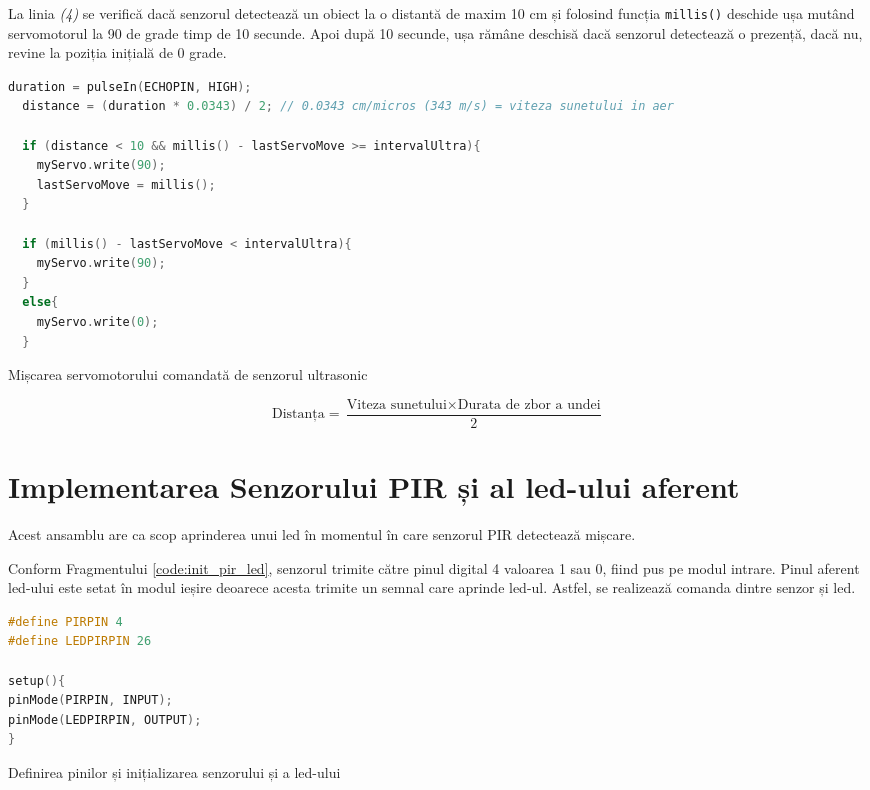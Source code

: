 La linia \textit{(4)} se verifică dacă senzorul detectează un obiect la o distantă de maxim 10 cm și folosind funcția \texttt{millis()} deschide ușa mutând servomotorul la 90 de grade timp de 10 secunde. Apoi după 10 secunde, ușa rămâne deschisă dacă senzorul detectează o prezență, dacă nu, revine la poziția inițială de 0 grade.

\begin{code}[H]
\begin{lstlisting}[language=C++]
  duration = pulseIn(ECHOPIN, HIGH);
  distance = (duration * 0.0343) / 2; // 0.0343 cm/micros (343 m/s) = viteza sunetului in aer
  
  if (distance < 10 && millis() - lastServoMove >= intervalUltra){ 
    myServo.write(90);
    lastServoMove = millis(); 
  }

  if (millis() - lastServoMove < intervalUltra){
    myServo.write(90); 
  }
  else{
    myServo.write(0);
  }
\end{lstlisting}
\caption{Mișcarea servomotorului comandată de senzorul ultrasonic}
\label{code:func_servo_hcsr}
\end{code}

\begin{equation}
\label{eq:distance}
\text{Distanța} = \frac{\text{Viteza sunetului} \times \text{Durata de zbor a undei}}{2}
\end{equation}

\section{Implementarea Senzorului PIR și al led-ului aferent}
\label{sec:senzor_pir_led}
Acest ansamblu are ca scop aprinderea unui led în momentul în care senzorul PIR detectează mișcare.

Conform Fragmentului \ref{code:init_pir_led}, senzorul trimite către pinul digital 4 valoarea 1 sau 0, fiind pus pe modul intrare. Pinul aferent led-ului este setat în modul ieșire deoarece acesta trimite un semnal care aprinde led-ul. Astfel, se realizează comanda dintre senzor și led.

\begin{code}[H]
\begin{lstlisting}[language=C++]
#define PIRPIN 4
#define LEDPIRPIN 26

setup(){
pinMode(PIRPIN, INPUT);
pinMode(LEDPIRPIN, OUTPUT);
}
\end{lstlisting}
\caption{Definirea pinilor și inițializarea senzorului și a led-ului}
\label{code:init_pir_led}
\end{code}

